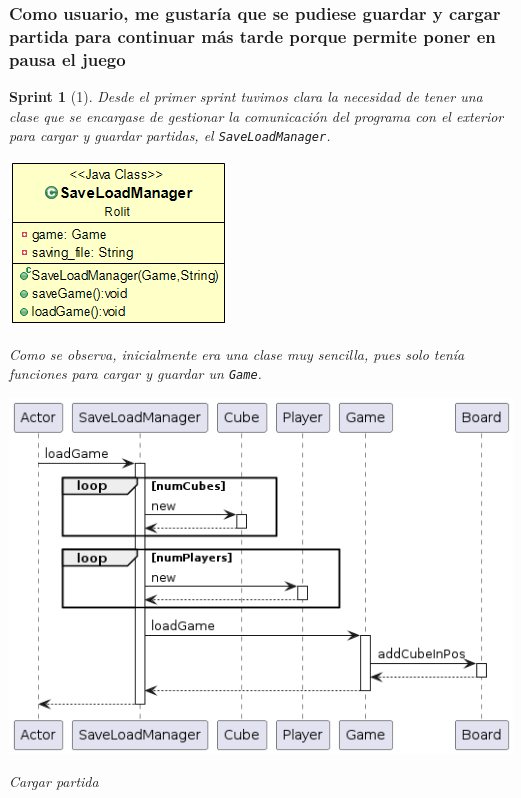 \documentclass[12pt,a4paper,openright]{book}
\theoremstyle{break}
\newtheorem*{sprint}{Sprint}
\begin{document}
\subsubsection{Como usuario, me gustaría que se pudiese guardar y cargar partida para continuar más tarde porque permite poner en pausa el juego}
\begin{sprint}[1]
Desde el primer sprint tuvimos clara la necesidad de tener una clase que se encargase de gestionar la comunicación del programa con el exterior para cargar y guardar partidas, el \texttt{SaveLoadManager}.

\begin{center}
\centering
\includegraphics[scale=0.5]{save-load-manager-sprint1.png}
\end{center}

Como se observa, inicialmente era una clase muy sencilla, pues solo tenía funciones para cargar y guardar un \texttt{Game}.

\begin{center}
\centering
\includegraphics[scale=0.5]{load-sprint1.png}

Cargar partida
\end{center}


\end{sprint}
\end{document}
